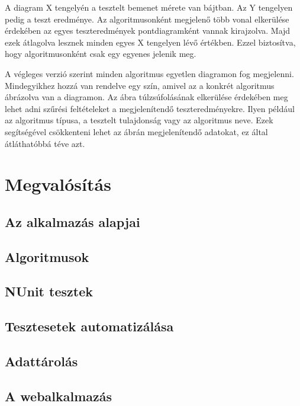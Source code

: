 \documentclass[12pt]{report} %
\begin{document}
A diagram X tengelyén a tesztelt bemenet mérete van bájtban. Az Y tengelyen pedig a teszt eredménye. Az algoritmusonként megjelenő több vonal elkerülése érdekében az egyes teszteredmények pontdiagramként vannak kirajzolva. Majd ezek átlagolva lesznek minden egyes X tengelyen lévő értékben. Ezzel biztosítva, hogy algoritmusonként csak egy egyenes jelenik meg.

A végleges verzió szerint minden algoritmus egyetlen diagramon fog megjelenni. Mindegyikhez hozzá van rendelve egy szín, amivel az a konkrét algoritmus ábrázolva van a diagramon. Az ábra túlzsúfolásának elkerülése érdekében meg lehet adni szűrési feltételeket a megjelenítendő teszteredményekre. Ilyen például az algoritmus típusa, a tesztelt tulajdonság vagy az algoritmus neve. Ezek segítségével csökkenteni lehet az ábrán megjelenítendő adatokat, ez által átláthatóbbá téve azt.

\chapter{Megvalósítás} %

\section{Az alkalmazás alapjai} %

\section{Algoritmusok} %

\section{NUnit tesztek} %

\section{Tesztesetek automatizálása} %

\section{Adattárolás} %

\section{A webalkalmazás} %
\end{document}
